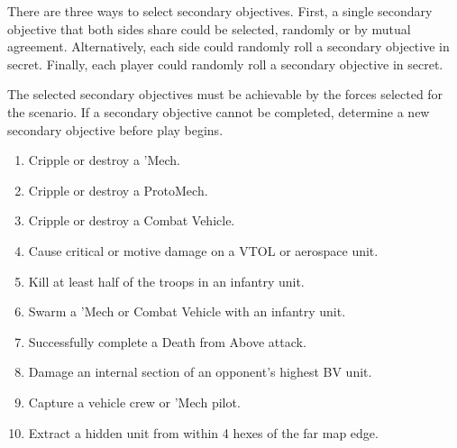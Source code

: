 There are three ways to select secondary objectives.
First, a single secondary objective that both sides share could be selected, randomly or by mutual agreement.
Alternatively, each side could randomly roll a secondary objective in secret.
Finally, each player could randomly roll a secondary objective in secret.

The selected secondary objectives must be achievable by the forces selected for the scenario.
If a secondary objective cannot be completed, determine a new secondary objective before play begins.

\begin{enumerate}

\item Cripple or destroy a 'Mech.

\item Cripple or destroy a ProtoMech.

\item Cripple or destroy a Combat Vehicle.

\item Cause critical or motive damage on a VTOL or aerospace unit.

\item Kill at least half of the troops in an infantry unit.

\item Swarm a 'Mech or Combat Vehicle with an infantry unit.

\item Successfully complete a Death from Above attack.

\item Damage an internal section of an opponent's highest BV unit.

\item Capture a vehicle crew or 'Mech pilot.

\item Extract a hidden unit from within 4 hexes of the far map edge.

\end{enumerate}
